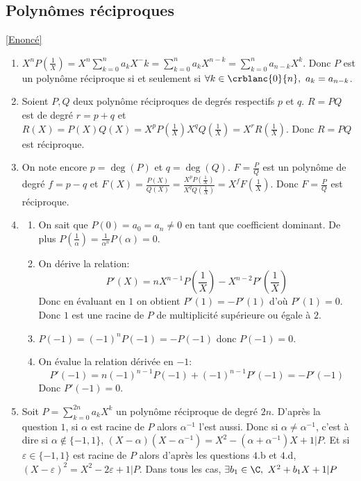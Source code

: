 \documentclass{book}
\begin{document}
	\subsection{Polynômes réciproques }
	\label{sec:polynomes-reciproques-etoile2}
	\textcolor{blue}{\hyperref[polyrecip]{[Enoncé]}}\\
	\begin{enumerate}[leftmargin=*]
		\item $X^nP\left(\displaystyle\frac{1}{X}\right)=X^n\displaystyle\sum\limits_{k=0}^n{a_kX^-k}=\displaystyle\sum\limits_{k=0}^n{a_kX^{n-k}}=\displaystyle\sum\limits_{k=0}^n{a_{n-k}X^k}$. Donc $P$ est un polynôme réciproque si et seulement si $\forall k\in \crblanc{0}{n},\ a_k=a_{n-k}$.
		\item Soient $P,Q$ deux polynôme réciproques de degrés respectifs $p$ et $q$. $R=PQ$ est de degré $r=p+q$ et $R(X)=P(X)Q(X)=X^pP\left(\displaystyle\frac{1}{X}\right)X^qQ\left(\displaystyle\frac{1}{X}\right)=X^rR\left(\displaystyle\frac{1}{X}\right)$. Donc $R=PQ$ est réciproque.
		\item On note encore $p=\deg(P)$ et $q=\deg(Q)$. $F=\displaystyle\frac{P}{Q}$ est un polynôme de degré $f=p-q$ et $F(X)=\displaystyle\frac{P(X)}{Q(X)}=\displaystyle\frac{X^pP\left(\displaystyle\frac{1}{X}\right)}{X^qQ\left(\displaystyle\frac{1}{X}\right)}=X^fF\left(\displaystyle\frac{1}{X}\right)$. Donc $F=\displaystyle\frac{P}{Q}$ est réciproque.
		\item \begin{enumerate}
			\item On sait que $P(0)=a_0=a_n\ne 0$ en tant que coefficient dominant. De plus $P\left(\displaystyle\frac{1}{\alpha}\right)=\displaystyle\frac{1}{\alpha^n}P(\alpha)=0$.
			\item On dérive la relation:
			$$P'(X)=nX^{n-1}P\left(\displaystyle\frac{1}{X}\right)-X^{n-2}P'\left(\displaystyle\frac{1}{X}\right)$$
			Donc en évaluant en $1$ on obtient $P'(1)=-P'(1)$ d'où $P'(1)=0$. Donc $1$ est une racine de $P$ de multiplicité supérieure ou égale à $2$.
			\item $P(-1)=(-1)^nP(-1)=-P(-1)$ donc $P(-1)=0$.
			\item On évalue la relation dérivée en $-1$:
			$$P'(-1)=n(-1)^{n-1}P(-1)+(-1)^{n-1}P'(-1)=-P'(-1)$$
			Donc $P'(-1)=0$.
		\end{enumerate}
		\item Soit $P=\displaystyle\sum\limits_{k=0}^{2n}{a_kX^k}$ un polynôme réciproque de degré $2n$. D'après la question $1$, si $\alpha$ est racine de $P$ alors $\alpha^{-1}$ l'est aussi. Donc si $\alpha\ne \alpha^{-1}$, c'est à dire si $\alpha \not \in \{-1,1\}$, $(X-\alpha)(X-\alpha^{-1})=X^2-(\alpha+\alpha^{-1})X+1|P$. Et si $\varepsilon\in \{-1,1\}$ est racine de $P$ alors d'après les questions $4$.b et $4$.d, $(X-\varepsilon)^2=X^2-2\varepsilon+1|P$. Dans tous les cas, $\exists b_1\in \C,\ X^2+b_1X+1|P$\\

\end{enumerate}
\end{document}
